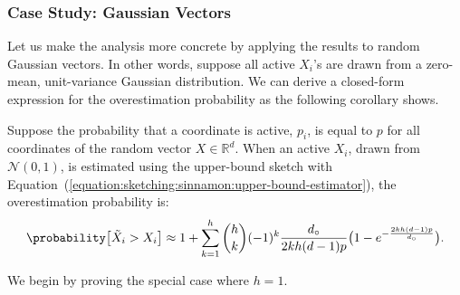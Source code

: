 \subsubsection{Case Study: Gaussian Vectors}
Let us make the analysis more concrete by applying the results to random Gaussian vectors.
In other words, suppose all active $X_i$'s are drawn from a zero-mean, unit-variance Gaussian
distribution. We can derive a closed-form expression for the overestimation probability
as the following corollary shows.

\begin{corollary}
    \label{corollary:sketching:sinnamon:sketching-error:gaussian}
    Suppose the probability that a coordinate is active, $p_i$, is equal to $p$
    for all coordinates of the random vector $X \in \mathbb{R}^d$.
    When an active $X_i$, drawn from $\mathcal{N}(0, 1)$, is estimated using the
    upper-bound sketch with Equation~(\ref{equation:sketching:sinnamon:upper-bound-estimator}),
    the overestimation probability is:
    \begin{equation*}
    \probability\big[ \tilde{X}_i > X_i \big] \approx 1 + \sum_{k=1}^{h} \binom{h}{k} (-1)^k \frac{d_\circ}{2kh(d-1)p} \big(1 - e^{-\frac{2kh(d-1)p}{d_\circ}} \big).
    \end{equation*}
\end{corollary}

We begin by proving the special case where $h=1$.

